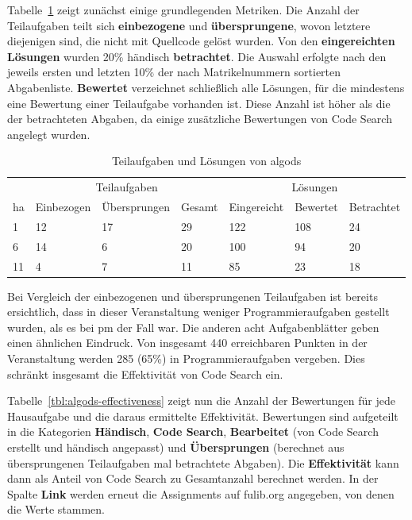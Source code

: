 Tabelle~\ref{tbl:algods-basics} zeigt zunächst einige grundlegenden Metriken.
Die Anzahl der Teilaufgaben teilt sich \textbf{einbezogene} und \textbf{übersprungene}, wovon letztere diejenigen sind, die nicht mit Quellcode gelöst wurden.
Von den \textbf{eingereichten Lösungen} wurden 20\% händisch \textbf{betrachtet}.
Die Auswahl erfolgte nach den jeweils ersten und letzten 10\% der nach Matrikelnummern sortierten Abgabenliste.
\textbf{Bewertet} verzeichnet schließlich alle Lösungen, für die mindestens eine Bewertung einer Teilaufgabe vorhanden ist.
Diese Anzahl ist höher als die der betrachteten Abgaben, da einige zusätzliche Bewertungen von Code Search angelegt wurden.

\begin{table}
    \centering
    \caption{Teilaufgaben und Lösungen von \ac{algods}}
    \begin{tabular}{|l|l|l|l|l|l|l|}
    \hline
        ~ & \multicolumn{3}{c|}{Teilaufgaben} & \multicolumn{3}{c|}{Lösungen} \\
        \acs{ha} & Einbezogen & Übersprungen & Gesamt & Eingereicht & Bewertet & Betrachtet \\ \hline
        1  & 12 & 17 & 29 & 122 & 108 & 24 \\ \hline
        6  & 14 &  6 & 20 & 100 &  94 & 20 \\ \hline
        11 &  4 &  7 & 11 &  85 &  23 & 18 \\ \hline
    \end{tabular}
    \label{tbl:algods-basics}
\end{table}

Bei Vergleich der einbezogenen und übersprungenen Teilaufgaben ist bereits ersichtlich, dass in dieser Veranstaltung weniger Programmieraufgaben gestellt wurden, als es bei \ac{pm} der Fall war.
Die anderen acht Aufgabenblätter geben einen ähnlichen Eindruck.
Von insgesamt 440 erreichbaren Punkten in der Veranstaltung werden 285 (65\%) in Programmieraufgaben vergeben.
Dies schränkt insgesamt die Effektivität von Code Search ein.

Tabelle~\ref{tbl:algods-effectiveness} zeigt nun die Anzahl der Bewertungen für jede Hausaufgabe und die daraus ermittelte Effektivität.
Bewertungen sind aufgeteilt in die Kategorien \textbf{Händisch}, \textbf{Code Search}, \textbf{Bearbeitet} (von Code Search erstellt und händisch angepasst) und \textbf{Übersprungen} (berechnet aus übersprungenen Teilaufgaben mal betrachtete Abgaben).
Die \textbf{Effektivität} kann dann als Anteil von Code Search zu Gesamtanzahl berechnet werden.
In der Spalte \textbf{Link} werden erneut die Assignments auf fulib.org angegeben, von denen die Werte stammen.

